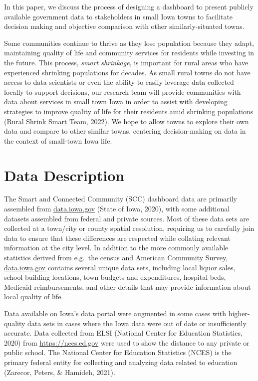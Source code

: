 \documentclass[print]{nuthesis}
\begin{document}
In this paper, we discuss the process of designing a dashboard to present publicly available government data to stakeholders in small Iowa towns to facilitate decision making and objective comparison with other similarly-situated towns.

Some communities continue to thrive as they lose population because they adapt, maintaining quality of life and community services for residents while investing in the future. This process, \emph{smart shrinkage}, is important for rural areas who have experienced shrinking populations for decades. As small rural towns do not have access to data scientists or even the ability to easily leverage data collected locally to support decisions, our research team will provide communities with data about services in small town Iowa in order to assist with developing strategies to improve quality of life for their residents amid shrinking populations (Rural Shrink Smart Team, 2022). We hope to allow towns to explore their own data and compare to other similar towns, centering decision-making on data in the context of small-town Iowa life.

\hypertarget{data-description}{%
\section{Data Description}\label{data-description}}

The Smart and Connected Community (SCC) dashboard data are primarily assembled from \url{data.iowa.gov} (State of Iowa, 2020), with some additional datasets assembled from federal and private sources. Most of these data sets are collected at a town/city or county spatial resolution, requiring us to carefully join data to ensure that these differences are respected while collating relevant information at the city level. In addition to the more commonly available statistics derived from e.g.~the census and American Community Survey, \url{data.iowa.gov} contains several unique data sets, including local liquor sales, school building locations, town budgets and expenditures, hospital beds, Medicaid reimbursements, and other details that may provide information about local quality of life.

Data available on Iowa's data portal were augmented in some cases with higher-quality data sets in cases where the Iowa data were out of date or insufficiently accurate.
Data collected from ELSI (National Center for Education Statistics, 2020) from \url{https://nces.ed.gov} were used to show the distance to any private or public school. The National Center for Education Statistics (NCES) is the primary federal entity for collecting and analyzing data related to education (Zarecor, Peters, \& Hamideh, 2021).
\end{document}
